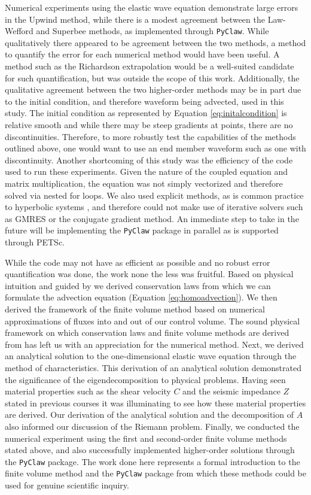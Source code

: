 \documentclass[review,onefignum,onetabnum]{siamart171218}
\begin{document}
Numerical experiments using the elastic wave equation demonstrate large errors in the Upwind method, while there is a modest agreement between the Law-Wefford and Superbee methods, as implemented through \texttt{PyClaw}. While qualitatively there appeared to be agreement between the two methods, a method to quantify the error for each numerical method would have been useful. A method such as the Richardson extrapolation would be a well-suited candidate for such quantification, but was outside the scope of this work. Additionally, the qualitative agreement between the two higher-order methods may be in part due to the initial condition, and therefore waveform being advected, used in this study. The initial condition as represented by Equation \ref{eq:initalcondition} is relative smooth and while there may be steep gradients at points, there are no discontinuities. Therefore, to more robustly test the capabilities of the methods outlined above, one would want to use an end member waveform such as one with discontinuity. Another shortcoming of this study was the efficiency of the code used to run these experiments. Given the nature of the coupled equation and matrix multiplication, the equation was not simply vectorized and therefore solved via nested for loops. We also used explicit methods, as is common practice to hyperbolic systems \cite{leveque_2002}, and therefore could not make use of iterative solvers such as GMRES or the conjugate gradient method. An immediate step to take in the future will be implementing the \texttt{PyClaw} package in parallel as is supported through PETSc.

While the code may not have as efficient as possible and no robust error quantification was done, the work none the less was fruitful. Based on physical intuition and guided by \cite{leveque_2002} we derived conservation laws from which we can formulate the advection equation (Equation \ref{eq:homoadvection}). We then derived the framework of the finite volume method based on numerical approximations of fluxes into and out of our control volume. The sound physical framework on which conservation laws and finite volume methods are derived from has left us with an appreciation for the numerical method. Next, we derived an analytical solution to the one-dimensional elastic wave equation through the method of characteristics. This derivation of an analytical solution demonstrated the significance of the eigendecomposition to physical problems. Having seen material properties such as the shear velocity $C$ and the seismic impedance $Z$ stated in previous courses it was illuminating to see how these material properties are derived. Our derivation of the analytical solution and the decomposition of $A$ also informed our discussion of the Riemann problem. Finally, we conducted the numerical experiment using the first and second-order finite volume methods stated above, and also successfully implemented higher-order solutions through the \texttt{PyClaw} package. The work done here represents a formal introduction to the finite volume method and the \texttt{PyClaw} package from which these methods could be used for genuine scientific inquiry. 
\end{document}
